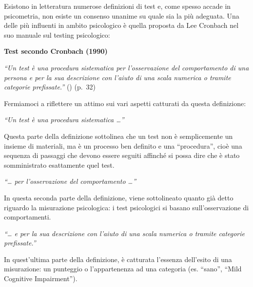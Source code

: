 \documentclass[
  italian,
  letterpaper,
  paper=A4,
  headinclude=on,
  footinclude=on,
  12pt]{scrbook}
\begin{document}
Esistono in letteratura numerose definizioni di test e, come spesso
accade in psicometria, non esiste un consenso unanime su quale sia la
più adeguata. Una delle più influenti in ambito psicologico è quella
proposta da Lee Cronbach nel suo manuale sul testing psicologico:

\begin{tcolorbox}[enhanced jigsaw, left=2mm, colbacktitle=quarto-callout-note-color!10!white, bottomrule=.15mm, opacityback=0, coltitle=black, colframe=quarto-callout-note-color-frame, opacitybacktitle=0.6, leftrule=.75mm, colback=white, toprule=.15mm, title=\textcolor{quarto-callout-note-color}{\faInfo}\hspace{0.5em}{Definizione}, titlerule=0mm, arc=.35mm, breakable, rightrule=.15mm, bottomtitle=1mm, toptitle=1mm]

\textbf{Test secondo Cronbach (1990)}

\emph{``Un test è una procedura sistematica per l'osservazione del
comportamento di una persona e per la sua descrizione con l'aiuto di una
scala numerica o tramite categorie prefissate.''}
(\cite{cronbach1990essentials}) (p.~32)

\end{tcolorbox}

Fermiamoci a riflettere un attimo sui vari aspetti catturati da questa
definizione:

\emph{``Un test è una procedura sistematica \ldots{}''}

Questa parte della definizione sottolinea che un test non è
semplicemente un insieme di materiali, ma è un processo ben definito e
una ``procedura'', cioè una sequenza di passaggi che devono essere
seguiti affinché si possa dire che è stato somministrato esattamente
quel test.

\emph{``\ldots{} per l'osservazione del comportamento \ldots{}''}

In questa seconda parte della definizione, viene sottolineato quanto già
detto riguardo la misurazione psicologica: i test psicologici si basano
sull'osservazione di comportamenti.

\emph{``\ldots{} e per la sua descrizione con l'aiuto di una scala
numerica o tramite categorie prefissate.''}

In quest'ultima parte della definizione, è catturata l'essenza
dell'esito di una misurazione: un punteggio o l'appartenenza ad una
categoria (es. ``sano'', ``Mild Cognitive Impairment'').
\end{document}
